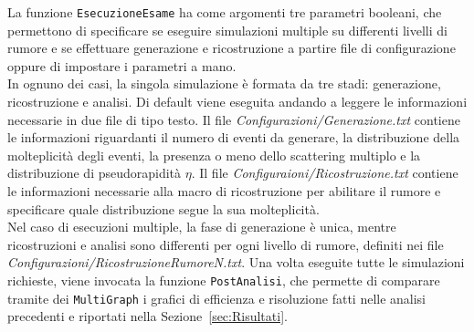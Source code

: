 \documentclass[11pt,a4paper]{article}
\begin{document}
La funzione \lstinline{EsecuzioneEsame} ha come argomenti tre parametri booleani, che permettono di specificare se eseguire simulazioni multiple su differenti livelli di rumore e se effettuare generazione e ricostruzione a partire file di configurazione oppure di impostare i parametri a mano.\\
In ognuno dei casi, la singola simulazione è formata da tre stadi: generazione, ricostruzione e analisi. Di default viene eseguita andando a leggere le informazioni necessarie in due file di tipo testo. Il file \textit{Configurazioni/Generazione.txt} contiene le informazioni riguardanti il numero di eventi da generare, la distribuzione della molteplicità degli eventi, la presenza o meno dello scattering multiplo e la distribuzione di pseudorapidità $\eta$. Il file \textit{Configuraioni/Ricostruzione.txt} contiene le informazioni necessarie alla macro di ricostruzione per abilitare il rumore e specificare quale distribuzione segue la sua molteplicità.\\
Nel caso di esecuzioni multiple, la fase di generazione è unica, mentre ricostruzioni e analisi sono differenti per ogni livello di rumore, definiti nei file \textit{Configurazioni/RicostruzioneRumoreN.txt}. Una volta eseguite tutte le simulazioni richieste, viene invocata la funzione \lstinline{PostAnalisi}, che permette di comparare tramite dei \lstinline{MultiGraph} i grafici di efficienza e risoluzione fatti nelle analisi precedenti e riportati nella Sezione~\ref{sec:Risultati}.\\
\end{document}

